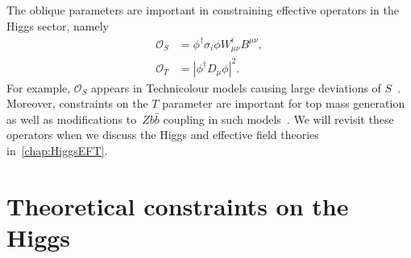 The oblique parameters are important in constraining effective operators in the Higgs sector, namely
\begin{align}
	\mathcal{O}_S &= \phi^\dagger \sigma_i \phi W^i_{\mu \nu} B^{\mu \nu}, \nonumber \\
	\mathcal{O}_T &= |\phi^\dagger D_\mu \phi|^2.
\end{align}
For example, $\mathcal{O}_S$ appears in Technicolour models causing large deviations of $S$~\cite{GOLDEN19913,HOLDOM199088,ALTARELLI19923,PhysRevLett.65.964}. Moreover,  constraints on the $T$ parameter are important for top mass generation as well as modifications to~$Z  b \bar{b}$ coupling in such models~\cite{PhysRevLett.69.575,Simmons:1995df}. We will revisit these operators when we discuss the Higgs and effective field theories in~\autoref{chap:HiggsEFT}.
\section{Theoretical constraints on the Higgs \label{sec:theoreticalconst}}
